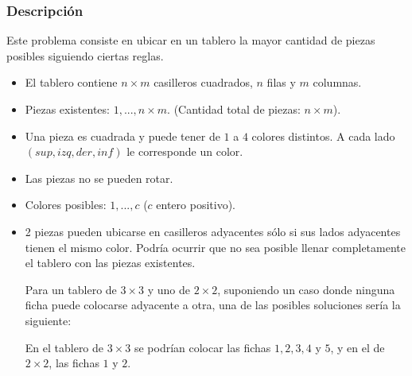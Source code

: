\documentclass[11pt, a4paper, twoside]{article}
\begin{document}
{}

\subsubsection{Descripción}

Este problema consiste en ubicar en un tablero la mayor cantidad de piezas
posibles siguiendo ciertas reglas.

\begin{itemize}   
	\item El tablero contiene $n \times m$ casilleros cuadrados, $n$ filas y $m$
	columnas.

	\item Piezas existentes: $1,...,n \times m$. (Cantidad total de 
	piezas: $n \times m$).

	\item Una pieza es cuadrada y puede tener de $1$ a $4$ colores distintos. 
	A cada lado $(sup, izq, der, inf)$ le corresponde un color. 

	\item Las piezas no se pueden rotar.

	\item Colores posibles: $1,...,c$ ($c$ entero positivo).

	\item 2 piezas pueden ubicarse en casilleros adyacentes sólo si sus lados 
	adyacentes tienen el mismo color. Podría ocurrir que no sea posible 
	llenar completamente el tablero con las piezas existentes. 



	Para un tablero de $3\times 3$ y uno de $2\times 2$, suponiendo un caso 
	donde ninguna ficha puede colocarse adyacente a otra, una de las posibles 
	soluciones sería la siguiente:

	En el tablero de $3\times 3$ se podrían colocar las fichas $1,2,3,4$ 
	y $5$, y en el de $2\times 2$, las fichas $1$ y $2$.


\end{itemize}
\end{document}
